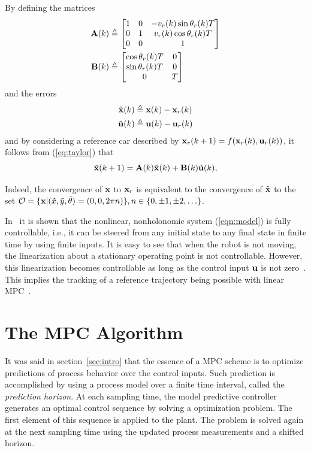 \documentclass[conference]{IEEEtran} %
\begin{document}
By defining the matrices
\begin{align*}
	{\bf A}(k) &\triangleq \begin{bmatrix}
		1 & 0 & -v_r(k)\sin\theta_r(k)T \\
		0 & 1 &  v_r(k)\cos\theta_r(k)T \\
		0 & 0 & 1
	\end{bmatrix} \\
	{\bf B}(k) &\triangleq \begin{bmatrix}
		\cos\theta_r(k)T & 0 \\
		\sin\theta_r(k)T & 0 \\
		0 			  & T
	\end{bmatrix}
\end{align*}
\noindent and the errors
\begin{align*}
	\tilde{\bf x}(k) &\triangleq {\bf x}(k)-{\bf x}_r(k) \\
	\tilde{\bf u}(k) &\triangleq {\bf u}(k)-{\bf u}_r(k)
\end{align*}
and by considering a reference car described by ${\bf x}_r(k+1)=f({\bf x}_r(k),{\bf u}_r(k))$, it follows from (\ref{eq:taylor}) that
\begin{equation*}\label{eqn:error}
	\tilde{\bf x}(k+1) = {\bf A}(k)\tilde{\bf x}(k)+{\bf B}(k)\tilde{\bf u}(k),
\end{equation*}

Indeed, the convergence of ${\bf x}$ to ${\bf x}_r$ is equivalent to the convergence of $\tilde{\bf x}$ to the set ${\cal O}=\{{\bf x}|(\tilde x,\tilde y,\tilde\theta)=(0,0,2\pi n)\},n\in \{0,\pm1,\pm2,\ldots\}$.

In~\cite{bloch89} it is shown that the nonlinear, nonholonomic system (\ref{eqn:model}) is fully controllable, i.e., it can be steered from any initial state to any final state in finite time by using finite inputs. It is easy to see that when the robot is not moving, the linearization about a stationary operating point is not controllable. However, this linearization becomes controllable as long as the control input ${\bf u}$ is not zero~\cite{samson91}. This implies the tracking of a reference trajectory being possible with linear MPC~\cite{essen01}.


\section{The MPC Algorithm}
\label{sec:mpc}

It was said in section~\ref{sec:intro} that the essence of a MPC scheme is to optimize predictions of process behavior over the control inputs. Such prediction is accomplished by using a process model over a finite time interval, called the {\em prediction horizon}. At each sampling time, the model predictive controller generates an optimal control sequence by solving a optimization problem. The first element of this sequence is applied to the plant. The problem is solved again at the next sampling time using the updated process measurements and a shifted horizon.
\end{document}
